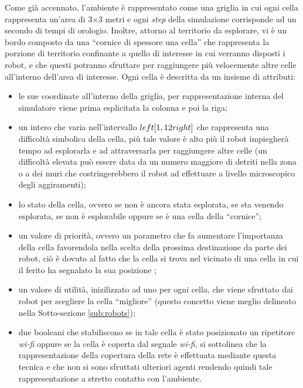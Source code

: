 Come già accennato, l'ambiente è rappresentato come una griglia in cui ogni cella rappresenta un'area di 3$\times$3 metri e ogni \textit{step} della simulazione corrisponde ad un secondo di tempi di orologio.
Inoltre, attorno al territorio da esplorare, vi è un bordo composto da una “cornice di spessore una cella” che rappresenta la porzione di territorio confinante a quello di interesse in cui verranno disposti i robot, e che questi potranno sfruttare per raggiungere più velocemente altre celle all'interno dell'area di interesse.
Ogni cella è descritta da un insieme di attributi:
\begin{itemize}
	\item le sue coordinate all'interno della griglia, per rappresentazione interna del simulatore viene prima esplicitata la colonna e poi la riga;
	\item un intero che varia nell'intervallo $\\left[1, 12\\right]$ che rappresenta una difficoltà simbolica della cella, più tale valore è alto più il robot impiegherà tempo ad esplorarla e ad attraversarla per raggiungere altre celle (un difficoltà elevata può essere data da un numero maggiore di detriti nella zona o a dei muri che costringerebbero il robot ad effettuare a livello microscopico degli aggiramenti);
	\item lo stato della cella, ovvero se non è ancora stata esplorata, se sta venendo esplorata, se non è esplorabile oppure se è una cella della “cornice”;
	\item un valore di priorità, ovvero un parametro che fa aumentare l'importanza della cella favorendola nella scelta della prossima destinazione da parte dei robot, ciò è dovuto al fatto che la cella si trova nel vicinato di una cella in cui il ferito ha segnalato la sua posizione ;
	\item un valore di utilità, inizilizzato ad uno per ogni cella, che viene sfruttato dai robot per scegliere la cella “migliore” (questo concetto viene meglio delineato nella Sotto-sezione \ref{sub:robots});
	\item due booleani che stabiliscono se in tale cella è stato posizionato un ripetitore \textit{wi-fi} oppure se la cella è coperta dal segnale \textit{wi-fi}, si sottolinea che la rappresentazione della copertura della rete è effettuata mediante questa tecnica e che non si sono sfruttati ulteriori agenti rendendo quindi tale rappresentazione a stretto contatto con l'ambiente.
\end{itemize}

